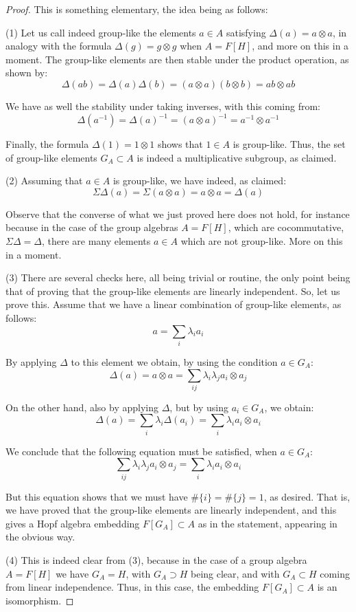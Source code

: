 \documentclass[12pt]{amsbook}
\begin{document}
\begin{proof}
This is something elementary, the idea being as follows:

\medskip

(1) Let us call indeed group-like the elements $a\in A$ satisfying $\Delta(a)=a\otimes a$, in analogy with the formula $\Delta(g)=g\otimes g$ when $A=F[H]$, and more on this in a moment. The group-like elements are then stable under the product operation, as shown by:
$$\Delta(ab)
=\Delta(a)\Delta(b)
=(a\otimes a)(b\otimes b)
=ab\otimes ab$$

We have as well the stability under taking inverses, with this coming from:
$$\Delta(a^{-1})
=\Delta(a)^{-1}
=(a\otimes a)^{-1}
=a^{-1}\otimes a^{-1}$$

Finally, the formula $\Delta(1)=1\otimes1$ shows that $1\in A$ is group-like. Thus, the set of group-like elements $G_A\subset A$ is indeed a multiplicative subgroup, as claimed.

\medskip

(2) Assuming that $a\in A$ is group-like, we have indeed, as claimed:
$$\Sigma\Delta(a)
=\Sigma(a\otimes a)
=a\otimes a
=\Delta(a)$$

Observe that the converse of what we just proved here does not hold, for instance because in the case of the group algebras $A=F[H]$, which are cocommutative, $\Sigma\Delta=\Delta$, there are many elements $a\in A$ which are not group-like. More on this in a moment.

\medskip

(3) There are several checks here, all being trivial or routine, the only point being that of proving that the group-like elements are linearly independent. So, let us prove this. Assume that we have a linear combination of group-like elements, as follows:
$$a=\sum_i\lambda_ia_i$$

By applying $\Delta$ to this element we obtain, by using the condition $a\in G_A$:
$$\Delta(a)
=a\otimes a
=\sum_{ij}\lambda_i\lambda_ja_i\otimes a_j$$

On the other hand, also by applying $\Delta$, but by using $a_i\in G_A$, we obtain:
$$\Delta(a)
=\sum_i\lambda_i\Delta(a_i)
=\sum_i\lambda_ia_i\otimes a_i$$

We conclude that the following equation must be satisfied, when $a\in G_A$:
$$\sum_{ij}\lambda_i\lambda_ja_i\otimes a_j=\sum_i\lambda_ia_i\otimes a_i$$

But this equation shows that we must have $\#\{i\}=\#\{j\}=1$, as desired. That is, we have proved that the group-like elements are linearly independent, and this gives a Hopf algebra embedding $F[G_A]\subset A$ as in the statement, appearing in the obvious way.

\medskip

(4) This is indeed clear from (3), because in the case of a group algebra $A=F[H]$ we have $G_A=H$, with $G_A\supset H$ being clear, and with $G_A\subset H$ coming from linear independence. Thus, in this case, the embedding $F[G_A]\subset A$ is an isomorphism.
\end{proof}
\end{document}
